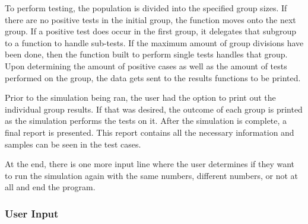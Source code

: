 \documentclass[letterpaper, 10pt,DIV=13]{scrartcl}
\numberwithin{equation}{section} %
\numberwithin{figure}{section} %
\numberwithin{table}{section} %
\begin{document}
To perform testing, the population is divided into the specified group sizes.  If there are no positive tests in the initial group, the function moves onto the next group.  If a positive test does occur in the first group, it delegates that subgroup to a function to handle sub-tests.  If the maximum amount of group divisions have been done, then the function built to perform single tests handles that group.  Upon determining the amount of positive cases as well as the amount of tests performed on the group, the data gets sent to the results functions to be printed.

Prior to the simulation being ran, the user had the option to print out the individual group results.  If that was desired, the outcome of each group is printed as the simulation performs the tests on it.  After the simulation is complete, a final report is presented.  This report contains all the necessary information and samples can be seen in the test cases. 

At the end, there is one more input line where the user determines if they want to run the simulation again with the same numbers, different numbers, or not at all and end the program.

\subsubsection{User Input}
\end{document}
